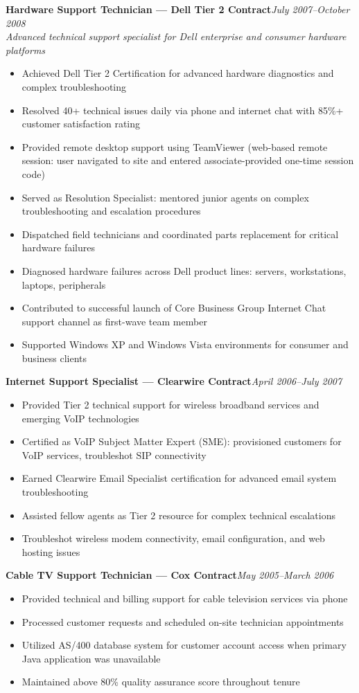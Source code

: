 \documentclass[9pt,letterpaper]{extarticle}
\begin{document}
\smallskip\textbf{Hardware Support Technician --- Dell Tier 2 Contract}\hfill\textit{July 2007--October 2008}\\
\textit{Advanced technical support specialist for Dell enterprise and consumer hardware platforms}
\begin{itemize}
  \item Achieved Dell Tier 2 Certification for advanced hardware diagnostics and complex troubleshooting
  \item Resolved 40+ technical issues daily via phone and internet chat with 85\%+ customer satisfaction rating
  \item Provided remote desktop support using TeamViewer (web-based remote session: user navigated to site and entered associate-provided one-time session code)
  \item Served as Resolution Specialist: mentored junior agents on complex troubleshooting and escalation procedures
  \item Dispatched field technicians and coordinated parts replacement for critical hardware failures
  \item Diagnosed hardware failures across Dell product lines: servers, workstations, laptops, peripherals
  \item Contributed to successful launch of Core Business Group Internet Chat support channel as first-wave team member
  \item Supported Windows XP and Windows Vista environments for consumer and business clients
\end{itemize}

\textbf{Internet Support Specialist --- Clearwire Contract}\hfill\textit{April 2006--July 2007}
\begin{itemize}
  \item Provided Tier 2 technical support for wireless broadband services and emerging VoIP technologies
  \item Certified as VoIP Subject Matter Expert (SME): provisioned customers for VoIP services, troubleshot SIP connectivity
  \item Earned Clearwire Email Specialist certification for advanced email system troubleshooting
  \item Assisted fellow agents as Tier 2 resource for complex technical escalations
  \item Troubleshot wireless modem connectivity, email configuration, and web hosting issues
\end{itemize}

\textbf{Cable TV Support Technician --- Cox Contract}\hfill\textit{May 2005--March 2006}
\begin{itemize}
  \item Provided technical and billing support for cable television services via phone
  \item Processed customer requests and scheduled on-site technician appointments
  \item Utilized AS/400 database system for customer account access when primary Java application was unavailable
  \item Maintained above 80\% quality assurance score throughout tenure
\end{itemize}
\end{document}
